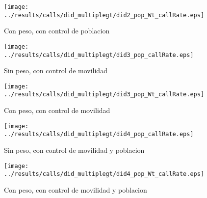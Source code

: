 \documentclass[11pt,letterpaper]{article}
\begin{document}
\begin{figure}[H]
\caption{Con peso, con control de poblacion}
\centering
\texttt{[image: ../results/calls/did\_multiplegt/did2\_pop\_Wt\_callRate.eps]}
\end{figure}
\begin{figure}[H]
\caption{Sin peso, con control de movilidad}
\centering
\texttt{[image: ../results/calls/did\_multiplegt/did3\_pop\_callRate.eps]}
\end{figure}

\begin{figure}[H]
\caption{Con peso, con control de movilidad}
\centering
\texttt{[image: ../results/calls/did\_multiplegt/did3\_pop\_Wt\_callRate.eps]}
\end{figure}
\begin{figure}[H]
\caption{Sin peso, con control de movilidad y poblacion}
\centering
\texttt{[image: ../results/calls/did\_multiplegt/did4\_pop\_callRate.eps]}
\end{figure}

\begin{figure}[H]
\caption{Con peso, con control de movilidad y poblacion}
\centering
\texttt{[image: ../results/calls/did\_multiplegt/did4\_pop\_Wt\_callRate.eps]}
\end{figure}
\end{document}
